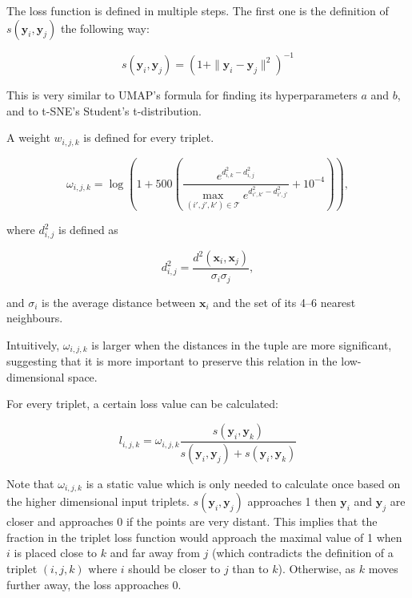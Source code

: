 The loss function is defined in multiple steps. The first one is the definition of $s(\mathbf{y}_i, \mathbf{y}_j)$ the following way:

\begin{equation}
	s(\mathbf{y}_i,\mathbf{y}_j)=\left(1+\|\mathbf{y}_i-\mathbf{y}_j\|^2\right)^{-1}
\end{equation}

This is very similar to UMAP's formula for finding its hyperparameters $a$ and $b$, and to t-SNE's Student's t-distribution.

A weight $w_{i,j,k}$ is defined for every triplet.

\begin{equation}
	\omega_{i,j,k} = \log\left(1+500\left(\frac{e^{d^2_{i,k}-d^2_{i,j}}}{\max_{(i',j',k')\in\mathcal{T}} e^{d^2_{i',k'}-d^2_{i',j'}}}+10^{-4}\right)\right),
\end{equation}

where $d^2_{i,j}$ is defined as

\begin{equation}
	\label{eq:trimap:d2}
	d^2_{i,j} = \frac{d^2(\mathbf{x}_i, \mathbf{x}_j)}{\sigma_i\sigma_j},
\end{equation}

and $\sigma_i$ is the average distance between $\mathbf{x}_i$ and the set of its 4--6 nearest neighbours.

Intuitively, $\omega_{i,j,k}$ is larger when the distances in the tuple are more significant, suggesting that it is more important to preserve this relation in the low-dimensional space.

For every triplet, a certain loss value can be calculated:

\begin{equation}
	l_{i,j,k}=\omega_{i,j,k}\frac{s(\mathbf{y}_i,\mathbf{y}_k)}{s(\mathbf{y}_i,\mathbf{y}_j)+s(\mathbf{y}_i,\mathbf{y}_k)}
\end{equation}

Note that $\omega_{i,j,k}$ is a static value which is only needed to calculate once based on the higher dimensional input triplets. $s(\mathbf{y}_i, \mathbf{y}_j)$ approaches 1 then $\mathbf{y}_i$ and $\mathbf{y}_j$ are closer and approaches 0 if the points are very distant.  This implies that the fraction in the triplet loss function would approach the maximal value of 1 when $i$ is placed close to $k$ and far away from $j$ (which contradicts the definition of a triplet $(i,j,k)$ where $i$ should be closer to $j$ than to $k$). Otherwise, as $k$ moves further away, the loss approaches 0.

